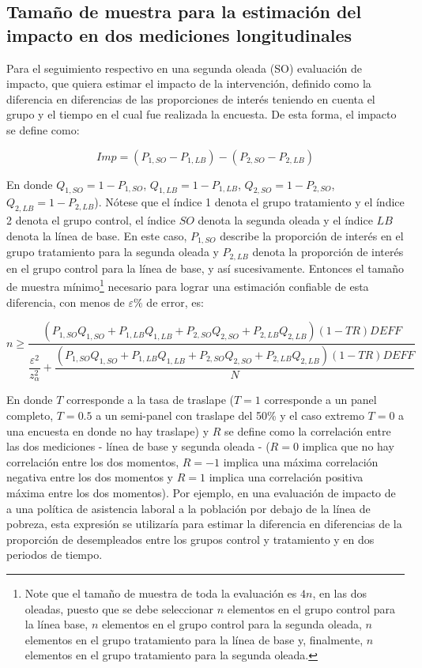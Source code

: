 \documentclass[
  12pt,
  spanish,
]{book}
\begin{document}
\hypertarget{tamauxf1o-de-muestra-para-la-estimaciuxf3n-del-impacto-en-dos-mediciones-longitudinales}{%
\subsection{Tamaño de muestra para la estimación del impacto en dos mediciones longitudinales}\label{tamauxf1o-de-muestra-para-la-estimaciuxf3n-del-impacto-en-dos-mediciones-longitudinales}}

Para el seguimiento respectivo en una segunda oleada (SO) evaluación de impacto, que quiera estimar el impacto de la intervención, definido como la diferencia en diferencias de las proporciones de interés teniendo en cuenta el grupo y el tiempo en el cual fue realizada la encuesta. De esta forma, el impacto se define como:

\begin{equation}
Imp=(P_{1,SO}-P_{1,LB})-(P_{2,SO}-P_{2,LB})
\end{equation}

En donde \(Q_{1,SO}=1-P_{1,SO}\), \(Q_{1,LB}=1-P_{1,LB}\), \(Q_{2,SO}=1-P_{2,SO}\), \(Q_{2,LB}=1-P_{2,LB}\)). Nótese que el índice 1 denota el grupo tratamiento y el índice 2 denota el grupo control, el índice \(SO\) denota la segunda oleada y el índice \(LB\) denota la línea de base. En este caso, \(P_{1,SO}\) describe la proporción de interés en el grupo tratamiento para la segunda oleada y \(P_{2,LB}\) denota la proporción de interés en el grupo control para la línea de base, y así sucesivamente. Entonces el tamaño de muestra mínimo\footnote{Note que el tamaño de muestra de toda la evaluación es $4n$, en las dos oleadas, puesto que se debe seleccionar $n$ elementos en el grupo control para la línea base, $n$ elementos en el grupo control para la segunda oleada, $n$ elementos en el grupo tratamiento para la línea de base y, finalmente, $n$ elementos en el grupo tratamiento para la segunda oleada.} necesario para lograr una estimación confiable de esta diferencia, con menos de \(\varepsilon\%\) de error, es:

\begin{equation} 
n \geq \dfrac{(P_{1,SO}Q_{1,SO}+P_{1,LB}Q_{1,LB}+P_{2,SO}Q_{2,SO}+P_{2,LB}Q_{2,LB})(1-TR)DEFF}{\dfrac{\varepsilon^2}{z_{\alpha}^2}+\dfrac{(P_{1,SO}Q_{1,SO}+P_{1,LB}Q_{1,LB}+P_{2,SO}Q_{2,SO}+P_{2,LB}Q_{2,LB})(1-TR)DEFF}{N}}
\end{equation}

En donde \(T\) corresponde a la tasa de traslape (\(T=1\) corresponde a un panel completo, \(T=0.5\) a un semi-panel con traslape del 50\% y el caso extremo \(T=0\) a una encuesta en donde no hay traslape) y \(R\) se define como la correlación entre las dos mediciones - línea de base y segunda oleada - (\(R=0\) implica que no hay correlación entre los dos momentos, \(R=-1\) implica una máxima correlación negativa entre los dos momentos y \(R=1\) implica una correlación positiva máxima entre los dos momentos). Por ejemplo, en una evaluación de impacto de a una política de asistencia laboral a la población por debajo de la línea de pobreza, esta expresión se utilizaría para estimar la diferencia en diferencias de la proporción de desempleados entre los grupos control y tratamiento y en dos periodos de tiempo.
\end{document}
